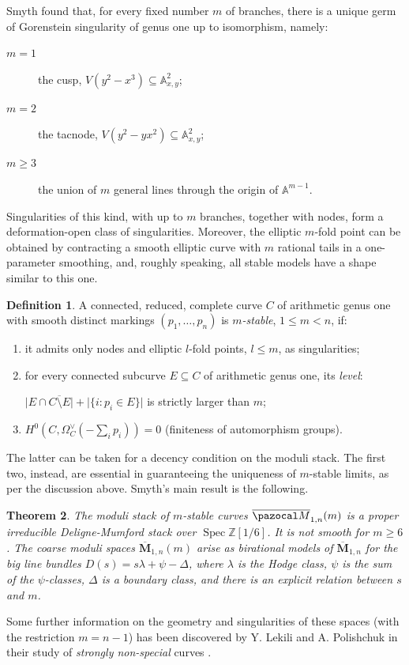 \documentclass{compositio}
\newcommand{\Aaff}{\mathbb A}
\newcommand{\oM}{\overline{\pazocal M}}
\theoremstyle{plain}
\newtheorem{thm}{Theorem}[section]
\theoremstyle{definition}
\newtheorem{definition}[thm]{Definition}
\theoremstyle{remark}
\begin{document}
Smyth found that, for every fixed number $m$ of branches, there is a unique germ of Gorenstein singularity of genus one up to isomorphism, namely:
\begin{description}
 \item[$m=1$] the cusp, $V(y^2-x^3)\subseteq\Aaff^2_{x,y}$;
 \item[$m=2$] the tacnode, $V(y^2-yx^2)\subseteq\Aaff^2_{x,y}$;
 \item[$m\geq 3$] the union of $m$ general lines through the origin of $\Aaff^{m-1}$.
\end{description}
Singularities of this kind, with up to $m$ branches, together with nodes, form a deformation-open class of singularities. Moreover, the elliptic $m$-fold point can be obtained by contracting a smooth elliptic curve with $m$ rational tails in a one-parameter smoothing, and, roughly speaking, all stable models have a shape similar to this one.
\begin{definition}\cite{SMY1}
 A connected, reduced, complete curve $C$ of arithmetic genus one with smooth distinct markings $(p_1,\ldots,p_n)$ is \emph{$m$-stable}, $1\leq m<n$, if:
 \begin{enumerate}[leftmargin=0.7cm]
  \item it admits only nodes and elliptic $l$-fold points, $l\leq m$, as singularities;
  \item for every connected subcurve $E\subseteq C$ of arithmetic genus one, its \emph{level}:
  
  \noindent$\lvert E\cap\overline{C\setminus E}\rvert+\lvert\{i\colon p_i\in E\}\rvert$ is strictly larger than $m$;
  \item $H^0(C,\Omega_C^\vee(-\sum_i p_i))=0$ (finiteness of automorphism groups).
 \end{enumerate}
\end{definition}
The latter can be taken for a decency condition on the moduli stack. The first two, instead, are essential in guaranteeing the uniqueness of $m$-stable limits, as per the discussion above. Smyth's main result is the following.
\begin{thm}\cite{SMY1,SMY2}
 The moduli stack of $m$-stable curves $\oM_{1,n}(m)$ is a proper irreducible Deligne-Mumford stack over $\operatorname{Spec}\mathbb Z[1/6]$. It is \emph{not} smooth for $m\geq 6$. The coarse moduli spaces $\overline{\mathbf{M}}_{1,n}(m)$ arise as birational models of $\overline{\mathbf{M}}_{1,n}$ for the big line bundles $D(s)=s\lambda+\psi-\Delta$, where $\lambda$ is the Hodge class, $\psi$ is the sum of the $\psi$-classes, $\Delta$ is a boundary class, and there is an explicit relation between $s$ and $m$.
\end{thm}
Some further information on the geometry and singularities of these spaces (with the restriction $m=n-1$) has been discovered by Y. Lekili and A. Polishchuk in their study of \emph{strongly non-special} curves \cite{Lekili-Polishchuk}.
\end{document}

